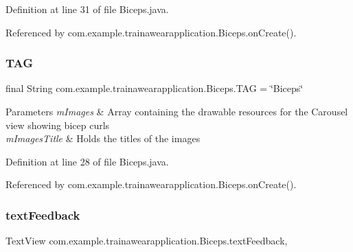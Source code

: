 Definition at line 31 of file Biceps.\+java.



Referenced by com.\+example.\+trainawearapplication.\+Biceps.\+on\+Create().

\mbox{\label{classcom_1_1example_1_1trainawearapplication_1_1_biceps_a7ceefbdf1885bee16f561985785d1305}} 
\subsubsection{\texorpdfstring{TAG}{TAG}}
{\footnotesize\ttfamily final String com.\+example.\+trainawearapplication.\+Biceps.\+T\+AG = \char`\"{}Biceps\char`\"{}\hspace{0.3cm}{\ttfamily [package]}}


\begin{DoxyParams}{Parameters}
{\em m\+Images} & Array containing the drawable resources for the Carousel view showing bicep curls \\
\hline
{\em m\+Images\+Title} & Holds the titles of the images \\
\hline
\end{DoxyParams}


Definition at line 28 of file Biceps.\+java.



Referenced by com.\+example.\+trainawearapplication.\+Biceps.\+on\+Create().

\mbox{\label{classcom_1_1example_1_1trainawearapplication_1_1_biceps_a2968dc5812ea82dc5df7cfa5d2f9b415}} 
\subsubsection{\texorpdfstring{textFeedback}{textFeedback}}
{\footnotesize\ttfamily Text\+View com.\+example.\+trainawearapplication.\+Biceps.\+text\+Feedback\hspace{0.3cm}{\ttfamily [static]}, {\ttfamily [package]}}



